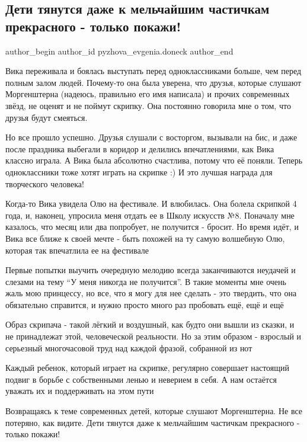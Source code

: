  
 
 
 
 
\subsection{Дети тянутся даже к мельчайшим частичкам прекрасного - только покажи!}
\label{sec:29_12_2021.vk.pyzhova_evgenia.doneck.1.skripka_vika}

\ifcmt
 author_begin
   author_id pyzhova_evgenia.doneck
 author_end
\fi


Вика переживала и боялась выступать перед одноклассниками больше, чем перед
полным залом людей. Почему-то она была уверена, что друзья, которые слушают
Моргенштерна (надеюсь, правильно его имя написала) и прочих современных звёзд,
не оценят и не поймут скрипку. Она постоянно говорила мне о том, что друзья
будут смеяться.

Но все прошло успешно. Друзья слушали с восторгом, вызывали на бис, и даже
после праздника выбегали в коридор и делились впечатлениями, как Вика классно
играла. А Вика была абсолютно счастлива, потому что её поняли. Теперь
одноклассники тоже хотят играть на скрипке :) И это лучшая награда для
творческого человека!

Когда-то Вика увидела Олю на фестивале. И влюбилась. Она болела скрипкой 4
года, и, наконец, упросила меня отдать ее в Школу искусств №8. Поначалу мне
казалось, что месяц или два попробует, не получится - бросит. Но время идёт, и
Вика все ближе к своей мечте - быть похожей на ту самую волшебную Олю, которая
так впечатлила ее на фестивале

Первые попытки выучить очередную мелодию всегда заканчиваются неудачей и
слезами на тему \enquote{У меня никогда не получится}. В такие моменты мне очень жаль
мою принцессу, но все, что я могу для нее сделать - это твердить, что она
обязательно справится, и нужно просто много раз пробовать ещё, ещё и ещё

Образ скрипача - такой лёгкий и воздушный, как будто они вышли из сказки, и не
принадлежат этой, человеческой реальности. Но за этим образом - взрослый и
серьезный многочасовой труд над каждой фразой, собранной из нот

Каждый ребенок, который играет на скрипке, регулярно совершает настоящий подвиг
в борьбе с собственными ленью и неверием в себя. А нам остаётся уважать их и
поддерживать на этом пути

Возвращаясь к теме современных детей, которые слушают Моргенштерна. Не все
потеряно, как видите. Дети тянутся даже к мельчайшим частичкам прекрасного -
только покажи!

